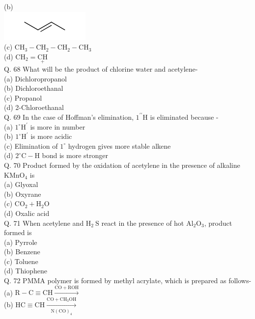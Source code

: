 \documentclass[10pt]{article}
\begin{document}
(b)\\
\includegraphics{smile-dec36457895f1b8fe943a2db092b3f93138b539c}\\
(c) $\mathrm{CH}_{3}-\mathrm{CH}_{2}-\mathrm{CH}_{2}-\mathrm{CH}_{3}$\\
(d) $\mathrm{CH}_{2}=\underset{+}{\mathrm{CH}}$\\
Q. 68 What will be the product of chlorine water and acetylene-\\
(a) Dichloropropanol\\
(b) Dichloroethanal\\
(c) Propanol\\
(d) 2-Chloroethanal\\
Q. 69 In the case of Hoffman's elimination, $1^{\prime \prime} \mathrm{H}$ is eliminated because -\\
(a) $1^{\circ} \mathrm{H}^{\prime}$ is more in number\\
(b) $1^{\circ} \mathrm{H}^{\prime}$ is more acidic\\
(c) Elimination of $1^{\circ}$ hydrogen gives more stable alkene\\
(d) $2^{\circ} \mathrm{C}-\mathrm{H}$ bond is more stronger\\
Q. 70 Product formed by the oxidation of acetylene in the presence of alkaline $\mathrm{KMnO}_{4}$ is\\
(a) Glyoxal\\
(b) Oxyrane\\
(c) $\mathrm{CO}_{2}+\mathrm{H}_{2} \mathrm{O}$\\
(d) Oxalic acid\\
Q. 71 When acetylene and $\mathrm{H}_{2} \mathrm{~S}$ react in the presence of hot $\mathrm{Al}_{2} \mathrm{O}_{3}$, product formed is\\
(a) Pyrrole\\
(b) Benzene\\
(c) Toluene\\
(d) Thiophene\\
Q. 72 PMMA polymer is formed by methyl acrylate, which is prepared as follows-\\
(a) $\mathrm{R}-\mathrm{C} \equiv \mathrm{CH} \xrightarrow{\mathrm{CO}+\mathrm{ROH}}$\\
(b) $\mathrm{HC} \equiv \mathrm{CH} \xrightarrow[\mathrm{N}(\mathrm{CO})_{4}]{\mathrm{CO}+\mathrm{CH}_{3} \mathrm{OH}}$\\
\end{document}
